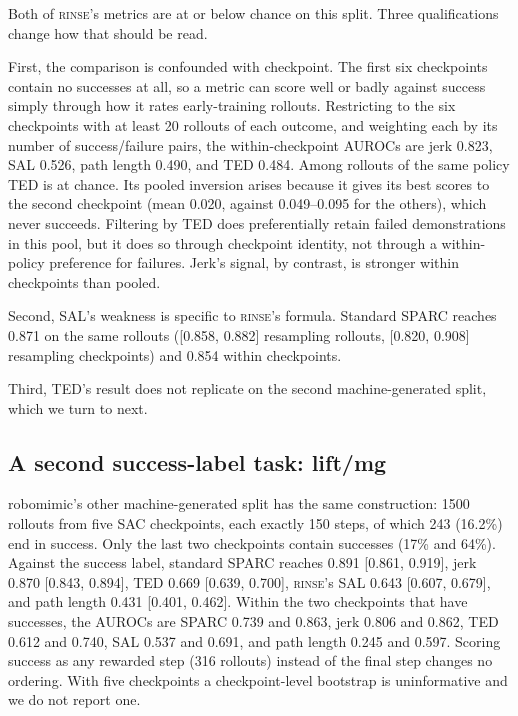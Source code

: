 \documentclass[10pt]{article}
\newcommand{\rinse}{\textmd{\textsc{rinse}}}
\begin{document}
Both of \rinse{}'s metrics are at or below chance on this split. Three
qualifications change how that should be read.

First, the comparison is confounded with checkpoint. The first six
checkpoints contain no successes at all, so a metric can score well or badly
against success simply through how it rates early-training rollouts.
Restricting to the six checkpoints with at least 20 rollouts of each
outcome, and weighting each by its number of success/failure pairs, the
within-checkpoint AUROCs are jerk 0.823, SAL 0.526, path length 0.490, and
TED 0.484. Among rollouts of the same policy TED is at chance. Its pooled
inversion arises because it gives its best scores to the second checkpoint
(mean 0.020, against 0.049--0.095 for the others), which never succeeds.
Filtering by TED does preferentially retain failed demonstrations in this
pool, but it does so through checkpoint identity, not through a
within-policy preference for failures. Jerk's signal, by contrast, is
stronger within checkpoints than pooled.

Second, SAL's weakness is specific to \rinse{}'s formula. Standard SPARC
reaches 0.871 on the same rollouts ([0.858, 0.882] resampling rollouts,
[0.820, 0.908] resampling checkpoints) and 0.854 within checkpoints.

Third, TED's result does not replicate on the second machine-generated
split, which we turn to next.

\subsection{A second success-label task: lift/mg}
\label{sec:lift}

robomimic's other machine-generated split has the same construction: 1500
rollouts from five SAC checkpoints, each exactly 150 steps, of which 243
(16.2\%) end in success. Only the last two checkpoints contain successes
(17\% and 64\%). Against the success label, standard SPARC reaches 0.891
[0.861, 0.919], jerk 0.870 [0.843, 0.894], TED 0.669 [0.639, 0.700],
\rinse{}'s SAL 0.643 [0.607, 0.679], and path length 0.431 [0.401, 0.462].
Within the two checkpoints that have successes, the AUROCs are SPARC 0.739
and 0.863, jerk 0.806 and 0.862, TED 0.612 and 0.740, SAL 0.537 and 0.691,
and path length 0.245 and 0.597. Scoring success as any rewarded step (316
rollouts) instead of the final step changes no ordering. With five
checkpoints a checkpoint-level bootstrap is uninformative and we do not
report one.
\end{document}
